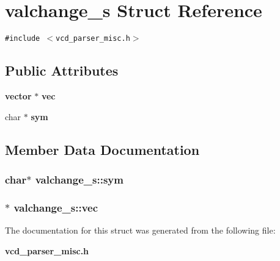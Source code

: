 \section{valchange\_\-s  Struct Reference}
\label{structvalchange__s}
{\tt \#include $<$vcd\_\-parser\_\-misc.h$>$}

\subsection*{Public Attributes}
\begin{CompactItemize}
\item 
{\bf vector} $\ast$ {\bf vec}
\item 
char $\ast$ {\bf sym}
\end{CompactItemize}


\subsection{Member Data Documentation}
\subsubsection{\setlength{\rightskip}{0pt plus 5cm}char$\ast$ valchange\_\-s::sym}\label{structvalchange__s_m1}


\subsubsection{$\ast$ valchange\_\-s::vec}\label{structvalchange__s_m0}




The documentation for this struct was generated from the following file:\begin{CompactItemize}
\item 
{\bf vcd\_\-parser\_\-misc.h}\end{CompactItemize}
